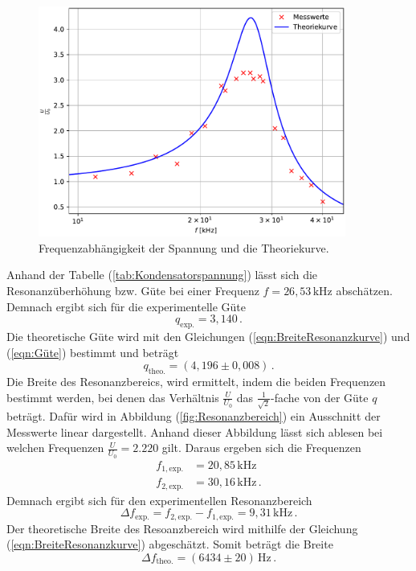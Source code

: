 \begin{figure}[H]
  \centering
  \includegraphics[width=0.90\textwidth]{plot_b.pdf}
  \caption{Frequenzabhängigkeit der Spannung und die Theoriekurve.}
  \label{fig:Frequenzabhängigkeit}
\end{figure}
Anhand der Tabelle (\ref{tab:Kondensatorspannung}) lässt sich die Resonanzüberhöhung bzw. Güte bei einer Frequenz $f = 26,53\,\unit{\kilo\hertz}$ abschätzen. Demnach ergibt sich für die 
experimentelle Güte
$$q_{\text{exp.}}= 3,140\,.$$
Die theoretische Güte wird mit den Gleichungen (\ref{eqn:BreiteResonanzkurve}) und (\ref{eqn:Güte}) bestimmt und beträgt
$$q_{\text{theo.}}=\left( 4,196\pm0,008 \right)\,.$$
Die Breite des Resonanzbereics, wird ermittelt, indem die beiden Frequenzen bestimmt werden, bei denen das Verhältnis $\frac{U}{U_0}$ das $\frac{1}{\sqrt{2}}$-fache von der
Güte $q$ beträgt. Dafür wird in Abbildung (\ref{fig:Resonanzbereich}) ein Ausschnitt der Messwerte linear dargestellt. Anhand dieser Abbildung lässt sich ablesen
bei welchen Frequenzen $\frac{U}{U_0} = 2.220$ gilt.
Daraus ergeben sich die Frequenzen
\begin{align*}
  f_{1,\text{exp.}} &= 20,85\,\unit{\kilo\hertz}\\
  f_{2,\text{exp.}} &= 30,16\,\unit{\kilo\hertz}\,.
\end{align*}
Demnach ergibt sich für den experimentellen Resonanzbereich 
$$\Delta f_{\text{exp.}}=  f_{2,\text{exp.}}-  f_{1,\text{exp.}}= 9,31\,\unit{\kilo\hertz}\,.$$
Der theoretische Breite des Resoanzbereich wird mithilfe der Gleichung (\ref{eqn:BreiteResonanzkurve}) abgeschätzt. Somit beträgt die Breite
$$\Delta f_{\text{theo.}}= \left(6434\pm20\right)\,\unit{\hertz}\,.$$
